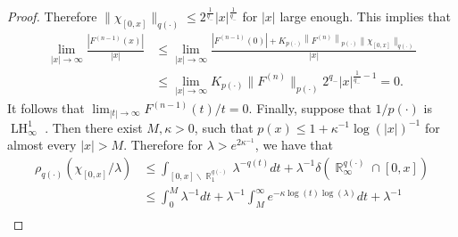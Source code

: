 \documentclass[11pt,reqno]{amsart}
\theoremstyle{definition}
\theoremstyle{definition}
\theoremstyle{definition}
\DeclareMathOperator{\R}{\mathbb{R}}
\newcommand{\p}{p(\cdot)}
\newcommand{\q}{q(\cdot)}
\newcommand{\defeq}{\vcentcolon=}
\newcommand{\LH}{\operatorname{LH}_\infty^1}
\begin{document}
\begin{proof}
    Therefore $\|\chi_{[0,x]}\|_{\q}\leq 2^{\frac{1}{q_{-}}}|x|^{\frac{1}{q_{-}}}$ for $|x|$ large enough. This implies that
    \begin{align*}   \lim_{|x|\to\infty}\frac{|F^{(n-1)}(x)|}{|x|}&\leq \lim_{|x|\to\infty}\frac{\left|F^{(n-1)}(0)\right|+K_{\p}\left\|F^{(n)}\right\|_{\p}\|\chi_{[0,x]}\|_{q(\cdot)}}{|x|}\\
    &\leq \lim_{|x|\to\infty}K_{\p}\|F^{(n)}\|_{\p}2^{q_{-}}|x|^{\frac{1}{q_{-}}-1}=0.
    \end{align*}
  It follows that $\lim _{|t| \rightarrow \infty} F^{(n-1)}(t) / t=0$.
    Finally, suppose that $1/\p$ is $\LH$ . Then there exist $M,\kappa>0$,  such that $p(x)\leq 1+\kappa^{-1}\log(|x|)^{-1}$ for almost every $|x|>M$. Therefore for $\lambda>e^{2\kappa^{-1}}$, we have that
    \begin{align*}
\rho_{\q}\left(\chi_{[0,x]}/\lambda\right)&\leq \int_{[0,x]\backslash\R^{\q}_1}\lambda^{-q(t)}dt+\lambda^{-1}\delta\left(\R^{\q}_\infty\cap [0,x]\right)\\
        &\leq \int_0^{M}\lambda^{-1}dt+  \lambda^{-1}\int_M^\infty e^{-\kappa\log(t)\log(\lambda)}dt+\lambda^{-1}\\

\end{align*}
\end{proof}
\end{document}
